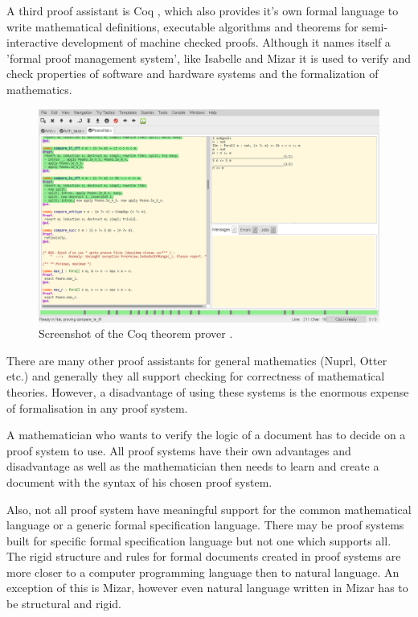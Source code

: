 A third proof assistant is Coq \cite{coq}, which also provides it's own formal language to write mathematical definitions, executable algorithms and theorems for semi-interactive development of machine checked proofs. Although it names itself a 'formal proof management system', like Isabelle and Mizar it is used to verify and check properties of software and hardware systems and the formalization of mathematics.

\begin{figure}[H]
\begin{center}
\includegraphics[scale=0.4]{Figures/Background/coq.png}
\end{center}
\caption{Screenshot of the Coq theorem prover \cite{coq}. \label{fig:coq}}
\end{figure}

There are many other proof assistants for general mathematics (Nuprl, Otter etc.) and generally they all support checking for correctness of mathematical theories. However, a disadvantage of using these systems is the enormous expense of formalisation in any proof system. 

A mathematician who wants to verify the logic of a document has to decide on a proof system to use. All proof systems have their own advantages and disadvantage as well as the mathematician then needs to learn and create a document with the syntax of his chosen proof system.

Also, not all proof system have meaningful support for the common mathematical language or a generic formal specification language. There may be proof systems built for specific formal specification language but not one which supports all. The rigid structure and rules for formal documents created in proof systems are more closer to a computer programming language then to natural language. An exception of this is Mizar, however even natural language written in Mizar has to be structural and rigid.

